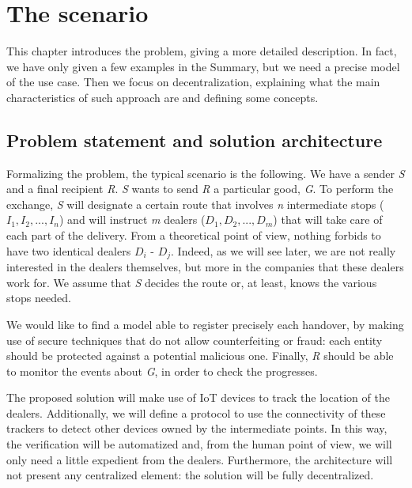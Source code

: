 \chapter{The scenario}
\label{cha:scenario}

This chapter introduces the problem, giving a more detailed description. In fact, we have only given a few examples in the Summary, but we need a precise model of the use case. Then we focus on decentralization, explaining what the main characteristics of such approach are and defining some concepts.

\section{Problem statement and solution architecture}
\label{sec:statement}
Formalizing the problem, the typical scenario is the following. We have a sender \textit{S} and a final recipient \textit{R}. \textit{S} wants to send \textit{R} a particular good, \textit{G}. To perform the exchange, \textit{S} will designate a certain route that involves \textit{n} intermediate stops ($I_1, I_2, ..., I_n$) and will instruct \textit{m} dealers ($D_1, D_2, ..., D_m$) that will take care of each part of the delivery. From a theoretical point of view, nothing forbids to have two identical dealers $D_i$ - $D_j$. Indeed, as we will see later, we are not really interested in the dealers themselves, but more in the companies that these dealers work for. We assume that \textit{S} decides the route or, at least, knows the various stops needed.

We would like to find a model able to register precisely each handover, by making use of secure techniques that do not allow counterfeiting or fraud: each entity should be protected against a potential malicious one. Finally, \textit{R} should be able to monitor the events about \textit{G}, in order to check the progresses.

The proposed solution will make use of IoT devices to track the location of the dealers. Additionally, we will define a protocol to use the connectivity of these trackers to detect other devices owned by the intermediate points. In this way, the verification will be automatized and, from the human point of view, we will only need a little expedient from the dealers. Furthermore, the architecture will not present any centralized element: the solution will be fully decentralized.

